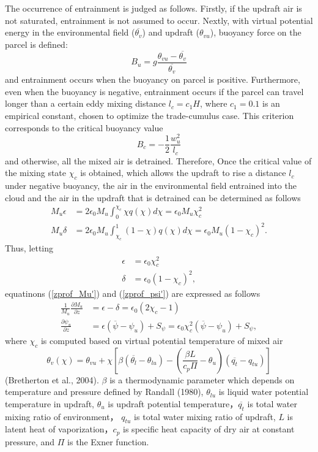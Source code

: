The occurrence of entrainment is judged as follows. Firstly, if the updraft air is not saturated, entrainment is not assumed to occur.
Nextly, with virtual potential energy in the environmental field ($\overline{\theta_v}$) and updraft ($\theta_{vu}$), buoyancy force on the parcel is defined:
\begin{equation}\label{buoy_u}
    B_u = g\frac{\theta_{vu} - \overline{\theta_{v}}}{ \overline{\theta_v}}
\end{equation}
and entrainment occurs when the buoyancy on parcel is positive.
Furthermore, even when the buoyancy is negative, entrainment occurs if the parcel can travel longer than a certain eddy mixing distance $l_c=c_1 H$, where $c_1=0.1$ is an empirical constant,
chosen to optimize the trade-cumulus case. This criterion corresponds to the critical buoyancy value
\begin{equation}\label{buoy_c}
    B_c = -\frac{1}{2}\frac{w_u^2}{l_c}
\end{equation}
and otherwise, all the mixed air is detrained.
Therefore, Once the critical value of the mixing state $\chi_c$ is obtained, which allows the updraft to rise a distance $l_c$ under negative buoyancy,
the air in the environmental field entrained into the cloud and the air in the updraft that is detrained can be determined as follows
\begin{align}
    M_u\epsilon&=2\epsilon_0 M_u\int_0^{\chi_c}\chi q(\chi) d\chi = \epsilon_0 M_u \chi_c^2 \label{flux_entre}\\
    M_u\delta&=2\epsilon_0 M_u\int_{\chi_c}^{1}(1-\chi) q(\chi) d\chi = \epsilon_0 M_u (1-\chi_c)^2. \label{flux_detre}
\end{align}
Thus, letting
\begin{align}
    \epsilon&=\epsilon_0\chi_c^2 \label{Etilde}\\
    \delta&=\epsilon_0(1-\chi_c)^2, \label{Dtilde}
\end{align}
equatinons (\ref{zprof_Mu'}) and (\ref{zprof_psi'}) are expressed as follows
\begin{align}
    \frac{1}{M_u}\frac{\partial M_u}{\partial z} &= \epsilon - \delta = \epsilon_0(2\chi_c - 1) \label{zprof_Mu_param}\\
    \frac{\partial \psi_u}{\partial z} &= \epsilon (\overline{\psi}-\psi_u) + S_{\psi} = \epsilon_0\chi_c^2(\overline{\psi}-\psi_u) + S_{\psi}, \label{zprof_psi_param}
\end{align}
where $\chi_c$ is computed based on virtual potential temperature of mixed air
\begin{equation}\label{virt_pot_t}
    \theta_v(\chi)=\theta_{vu}+\chi\left[ \beta(\overline{\theta_l}-\theta_{lu})-\left(\frac{\beta L}{c_p\Pi}-\theta_u\right)(\overline{q_t}-q_{tu})\right]
\end{equation}
(Bretherton et al., 2004). $\beta$ is a thermodynamic parameter which depends on temperature and pressure defined by Randall (1980),
$\theta_{lu}$ is liquid water potential temperature in updraft, $\theta_u$ is updraft potential temperature，$\overline{q_t}$ is total water mixing ratio of environment，
$q_{tu}$ is total water mixing ratio of updraft, $L$ is latent heat of vaporization，$c_p$ is specific heat capacity of dry air at constant pressure, and $\Pi$ is the Exner function.

